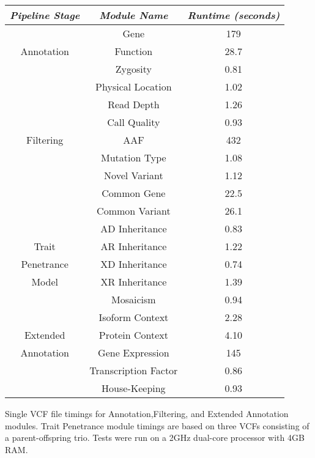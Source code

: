 

\begin{table}[!b]
{\begin{tabular}{| c | *2c |} \hline %
\emph{Pipeline Stage} & \emph{Module Name} & \emph{Runtime (seconds)} \\
\hline
             & Gene     & 179\\
Annotation   & Function & 28.7\\
             & Zygosity & 0.81\\
\hline
             & Physical Location & 1.02 \\
             & Read Depth        & 1.26 \\
             & Call Quality      & 0.93\\
Filtering    & AAF               & 432\\
             & Mutation Type     & 1.08\\
             & Novel Variant     & 1.12\\
             & Common Gene       & 22.5\\
             & Common Variant    & 26.1\\
\hline
             & AD Inheritance    & 0.83\\
 Trait       & AR Inheritance    & 1.22\\
Penetrance   & XD Inheritance    & 0.74\\
  Model      & XR Inheritance    & 1.39\\
             & Mosaicism         & 0.94\\
\hline
                 & Isoform Context      & 2.28\\
   Extended      & Protein Context      & 4.10\\
 Annotation      & Gene Expression      & 145\\
                 & Transcription Factor & 0.86\\
                 & House-Keeping        & 0.93\\
\hline
\end{tabular}}
{Single VCF file timings for Annotation,Filtering, and Extended Annotation modules. Trait Penetrance module timings are based on three VCFs consisting of a parent-offspring trio. Tests were run on a 2GHz dual-core processor with 4GB RAM.}
\end{table}
